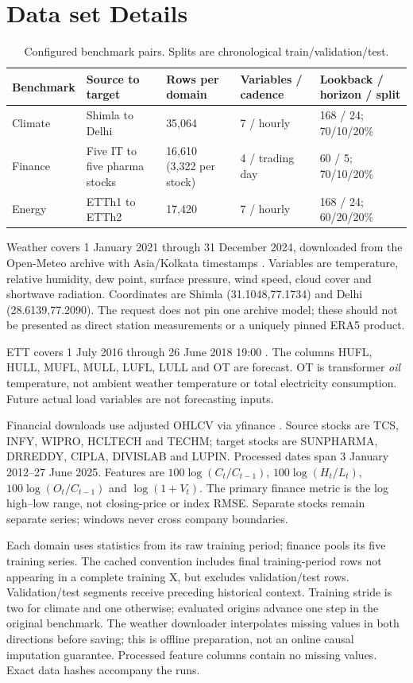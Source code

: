 \documentclass[twoside,english]{article}
\begin{document}
\section{Data set Details}\label{sec:data}
\begin{longtable}{@{}p{}p{}p{}p{}p{}@{}}
\caption{Configured benchmark pairs. Splits are chronological train/validation/test.}\\\toprule
Benchmark&Source to target&Rows per domain&Variables / cadence&Lookback / horizon / split\\\midrule\endhead
Climate&Shimla to Delhi&35,064&7 / hourly&168 / 24; 70/10/20\%\\
Finance&Five IT to five pharma stocks&16,610 (3,322 per stock)&4 / trading day&60 / 5; 70/10/20\%\\
Energy&ETTh1 to ETTh2&17,420&7 / hourly&168 / 24; 60/20/20\%\\\bottomrule
\end{longtable}
Weather covers 1 January 2021 through 31 December 2024, downloaded from the Open-Meteo archive with Asia/Kolkata timestamps \citep{OpenMeteo}. Variables are temperature, relative humidity, dew point, surface pressure, wind speed, cloud cover and shortwave radiation. Coordinates are Shimla (31.1048,77.1734) and Delhi (28.6139,77.2090). The request does not pin one archive model; these should not be presented as direct station measurements or a uniquely pinned ERA5 product.

ETT covers 1 July 2016 through 26 June 2018 19:00 \citep{ETT}. The columns HUFL, HULL, MUFL, MULL, LUFL, LULL and OT are forecast. OT is transformer \emph{oil} temperature, not ambient weather temperature or total electricity consumption. Future actual load variables are not forecasting inputs.

Financial downloads use adjusted OHLCV via yfinance \citep{Finance}. Source stocks are TCS, INFY, WIPRO, HCLTECH and TECHM; target stocks are SUNPHARMA, DRREDDY, CIPLA, DIVISLAB and LUPIN. Processed dates span 3 January 2012--27 June 2025. Features are $100\log(C_t/C_{t-1})$, $100\log(H_t/L_t)$, $100\log(O_t/C_{t-1})$ and $\log(1+V_t)$. The primary finance metric is the log high--low range, not closing-price or index RMSE. Separate stocks remain separate series; windows never cross company boundaries.

Each domain uses statistics from its raw training period; finance pools its five training series. The cached convention includes final training-period rows not appearing in a complete training X, but excludes validation/test rows. Validation/test segments receive preceding historical context. Training stride is two for climate and one otherwise; evaluated origins advance one step in the original benchmark. The weather downloader interpolates missing values in both directions before saving; this is offline preparation, not an online causal imputation guarantee. Processed feature columns contain no missing values. Exact data hashes accompany the runs.
\end{document}

